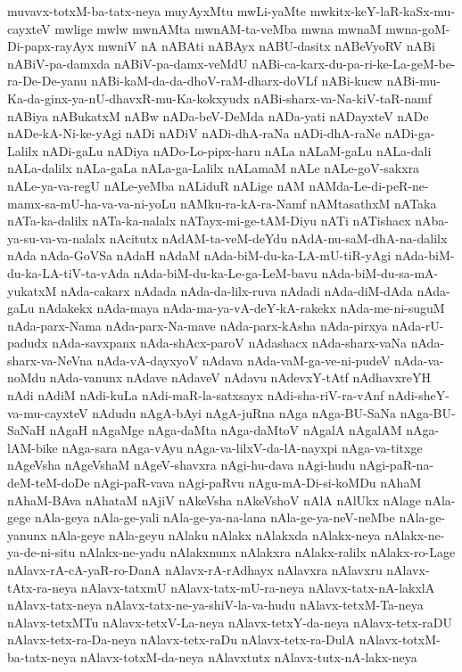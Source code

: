 {muvavx-totxM-ba-tatx-neya
muyAyxMtu
mwLi-yaMte
mwkitx-keY-laR-kaSx-mu-cayxteV
mwlige
mwlw
mwnAMta
mwnAM-ta-veMba
mwna
mwnaM
mwna-goM-Di-papx-rayAyx
mwniV
nA
nABAti
nABAyx
nABU-dasitx
nABeVyoRV
nABi
nABiV-pa-damxda
nABiV-pa-damx-veMdU
nABi-ca-karx-du-pa-ri-ke-La-geM-be-ra-De-De-yanu
nABi-kaM-da-da-dhoV-raM-dharx-doVLf
nABi-kucw
nABi-mu-Ka-da-ginx-ya-nU-dhavxR-mu-Ka-kokxyudx
nABi-sharx-va-Na-kiV-taR-namf
nABiya
nABukatxM
nABw
nADa-beV-DeMda
nADa-yati
nADayxteV
nADe
nADe-kA-Ni-ke-yAgi
nADi
nADiV
nADi-dhA-raNa
nADi-dhA-raNe
nADi-ga-Lalilx
nADi-gaLu
nADiya
nADo-Lo-pipx-haru
nALa
nALaM-gaLu
nALa-dali
nALa-dalilx
nALa-gaLa
nALa-ga-Lalilx
nALamaM
nALe
nALe-goV-sakxra
nALe-ya-va-regU
nALe-yeMba
nALiduR
nALige
nAM
nAMda-Le-di-peR-ne-mamx-sa-mU-ha-va-va-ni-yoLu
nAMku-ra-kA-ra-Namf
nAMtasathxM
nATaka
nATa-ka-dalilx
nATa-ka-nalalx
nATayx-mi-ge-tAM-Diyu
nATi
nATishacx
nAba-ya-su-va-va-nalalx
nAcitutx
nAdAM-ta-veM-deYdu
nAdA-nu-saM-dhA-na-dalilx
nAda
nAda-GoVSa
nAdaH
nAdaM
nAda-biM-du-ka-LA-mU-tiR-yAgi
nAda-biM-du-ka-LA-tiV-ta-vAda
nAda-biM-du-ka-Le-ga-LeM-bavu
nAda-biM-du-sa-mA-yukatxM
nAda-cakarx
nAdada
nAda-da-lilx-ruva
nAdadi
nAda-diM-dAda
nAda-gaLu
nAdakekx
nAda-maya
nAda-ma-ya-vA-deY-kA-rakekx
nAda-me-ni-suguM
nAda-parx-Nama
nAda-parx-Na-mave
nAda-parx-kAsha
nAda-pirxya
nAda-rU-padudx
nAda-savxpanx
nAda-shAcx-paroV
nAdashacx
nAda-sharx-vaNa
nAda-sharx-va-NeVna
nAda-vA-dayxyoV
nAdava
nAda-vaM-ga-ve-ni-pudeV
nAda-va-noMdu
nAda-vanunx
nAdave
nAdaveV
nAdavu
nAdevxY-tAtf
nAdhavxreYH
nAdi
nAdiM
nAdi-kuLa
nAdi-maR-la-satxsayx
nAdi-sha-riV-ra-vAnf
nAdi-sheY-va-mu-cayxteV
nAdudu
nAgA-bAyi
nAgA-juRna
nAga
nAga-BU-SaNa
nAga-BU-SaNaH
nAgaH
nAgaMge
nAga-daMta
nAga-daMtoV
nAgalA
nAgalAM
nAga-lAM-bike
nAga-sara
nAga-vAyu
nAga-va-lilxV-da-lA-nayxpi
nAga-va-titxge
nAgeVsha
nAgeVshaM
nAgeV-shavxra
nAgi-hu-dava
nAgi-hudu
nAgi-paR-na-deM-teM-doDe
nAgi-paR-vava
nAgi-paRvu
nAgu-mA-Di-si-koMDu
nAhaM
nAhaM-BAva
nAhataM
nAjiV
nAkeVsha
nAkeVshoV
nAlA
nAlUkx
nAlage
nAla-gege
nAla-geya
nAla-ge-yali
nAla-ge-ya-na-lana
nAla-ge-ya-neV-neMbe
nAla-ge-yanunx
nAla-geye
nAla-geyu
nAlaku
nAlakx
nAlakxda
nAlakx-neya
nAlakx-ne-ya-de-ni-situ
nAlakx-ne-yadu
nAlakxnunx
nAlakxra
nAlakx-ralilx
nAlakx-ro-Lage
nAlavx-rA-cA-yaR-ro-DanA
nAlavx-rA-rAdhayx
nAlavxra
nAlavxru
nAlavx-tAtx-ra-neya
nAlavx-tatxmU
nAlavx-tatx-mU-ra-neya
nAlavx-tatx-nA-lakxlA
nAlavx-tatx-neya
nAlavx-tatx-ne-ya-shiV-la-va-hudu
nAlavx-tetxM-Ta-neya
nAlavx-tetxMTu
nAlavx-tetxV-La-neya
nAlavx-tetxY-da-neya
nAlavx-tetx-raDU
nAlavx-tetx-ra-Da-neya
nAlavx-tetx-raDu
nAlavx-tetx-ra-DulA
nAlavx-totxM-ba-tatx-neya
nAlavx-totxM-da-neya
nAlavxtutx
nAlavx-tutx-nA-lakx-neya
}

